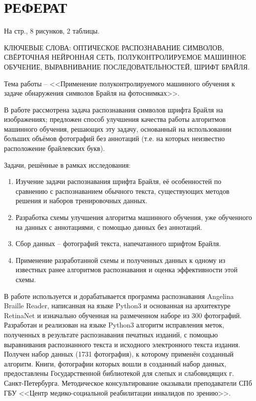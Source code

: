 \documentclass{main.tex}[subfiles]
\begin{document}
\thispagestyle{empty}
\section*{РЕФЕРАТ}

На \pageref*{LastPage} стр., 8 рисунков, 2 таблицы.

КЛЮЧЕВЫЕ СЛОВА: ОПТИЧЕСКОЕ РАСПОЗНАВАНИЕ СИМВОЛОВ, СВЁРТОЧНАЯ НЕЙРОННАЯ СЕТЬ, ПОЛУКОНТРОЛИРУЕМОЕ МАШИННОЕ ОБУЧЕНИЕ, ВЫРАВНИВАНИЕ ПОСЛЕДОВАТЕЛЬНОСТЕЙ, ШРИФТ БРАЙЛЯ.

Тема работы -- <<Применение полуконтролируемого машинного обучения к задаче обнаружения символов Брайля на фотоснимках>>.

В работе рассмотрена задача распознавания символов шрифта Брайля на изображениях; предложен способ улучшения качества работы алгоритмов машинного обучения, решающих эту задачу, основанный на использовании больших объёмов фотографий без аннотаций (т.е. на которых неизвестно расположение брайлевских букв).

Задачи, решённые в рамках исследования:
\begin{enumerate}[noitemsep]
    \item Изучение задачи распознавания шрифта Брайля, её особенностей по сравнению с распознаванием обычного текста, существующих методов решения и наборов тренировочных данных.
    \item Разработка схемы улучшения алгоритма машинного обучения, уже обученного на данных с аннотациями, с помощью данных без аннотаций.
    \item Сбор данных -- фотографий текста, напечатанного шрифтом Брайля.
    \item Применение разработанной схемы и полученных данных к одному из известных ранее алгоритмов распознавания и оценка эффективности этой схемы.
\end{enumerate}

В работе используется и дорабатывается программа распознавания Angelina Braille Reader, написанная на языке Python3 и основанная на архитектуре Retina\-Net и изначально обученная на размеченном наборе из 300 фотографий.
Разработан и реализован на языке Python3 алгоритм исправления меток, полученных в результате распознавания печатных изданий, с помощью выравнивания распознанного текста и исходного электронного текста издания.
Получен набор данных (1731 фотография), к которому применён созданный алгоритм.
Книги, фотографии которых вошли в созданный набор данных, предоставлены Государственной библиотекой для слепых и слабовидящих г. Санкт-Петербурга.
Методическое консультирование оказывали преподаватели СПб ГБУ <<Центр медико-социальной реабилитации инвалидов по зрению>>.
\end{document}
